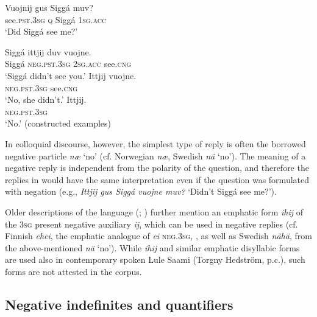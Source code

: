 \documentclass[output=paper,colorlinks,citecolor=brown]{langscibook}
\begin{document}
\ea\label{ex:lul:30} 
    \begin{xlist}[Q: ]
    \label{ex:lul:30q}
        \gll Vuojnij gus Siggá muv? \\ 
             see.\textsc{pst.3sg} \textsc{q} Siggá \textsc{1sg.acc} \\
        \glt  ‘Did Siggá see me?’
    \end{xlist}
    \ea\label{ex:lul:30a}
        \gll Siggá ittjij duv vuojne. \\ 
             Siggá \textsc{neg}.\textsc{pst.3sg} \textsc{2sg.acc} see\textsc{.cng} \\
        \glt ‘Siggá didn’t see you.’
    \ex\label{ex:lul:30b}
        \gll Ittjij vuojne. \\
             \textsc{neg}.\textsc{pst.3sg} see\textsc{.cng} \\
        \glt  ‘No, she didn’t.’
    \ex\label{ex:lul:30c}
        \gll Ittjij. \\
             \textsc{neg}.\textsc{pst.3sg} \\
        \glt ‘No.’ (constructed examples)
    \z
\z 

In colloquial discourse, however, the simplest type of reply is often the borrowed negative particle \textit{næ} ‘no’ (cf. Norwegian \textit{næ}, Swedish \textit{nä} ‘no’). The meaning of a negative reply is independent from the polarity of the question, and therefore the replies in  would have the same interpretation even if the question was formulated with negation (e.g., \textit{Ittjij gus Siggá vuojne muv?} ‘Didn’t Siggá see me?’).

Older descriptions of the language (\citealt[185]{Wiklund1891}; \citealt[19]{Collinder1938}) further mention an emphatic form \textit{ihij} of the \textsc{3sg} present negative auxiliary \textit{ij}, which can be used in negative replies (cf. Finnish \textit{ehei}, the emphatic analogue of \textit{ei} \textsc{neg.3sg}, \citealt[658–659]{Penttilä1963}, as well as Swedish \textit{nähä}, from the above-mentioned \textit{nä} ‘no’). While \textit{ihij} and similar emphatic disyllabic forms are used also in contemporary spoken Lule Saami (Torgny Hedström, p.c.), such forms are not attested in the corpus.

\subsection{Negative indefinites and quantifiers} \label{sec:lul:3.2}
\end{document}
